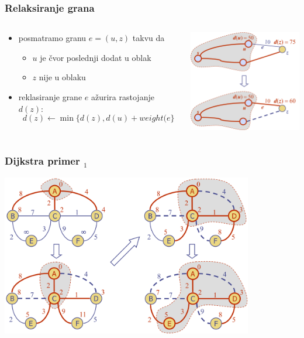 \documentclass[compress,aspectratio=169]{beamer}
\begin{document}
\begin{frame}[fragile]
  \frametitle{Relaksiranje grana}
  \begin{columns}
    \begin{column}[t]{6cm}
      \begin{itemize}
        \item posmatramo granu $e=(u,z)$ takvu da
        \begin{itemize}
          \item $u$ je čvor poslednji dodat u oblak
          \item $z$ nije u oblaku
        \end{itemize}
        \item reklasiranje grane $e$ ažurira rastojanje $d(z)$:
          $$ d(z) \leftarrow \min\{d(z), d(u)+weight(e\}$$
      \end{itemize}
    \end{column}
    \begin{column}[t]{6cm}
  \begin{center}
    \includegraphics[width=5cm]{asp-14-pic61.png}
  \end{center}
    \end{column}
  \end{columns}
\end{frame}

\begin{frame}[fragile]
  \frametitle{Dijkstra primer $_1$}
  \begin{center}
    \includegraphics[width=11cm]{asp-14-pic62.png}
  \end{center}
\end{frame}
\end{document}

